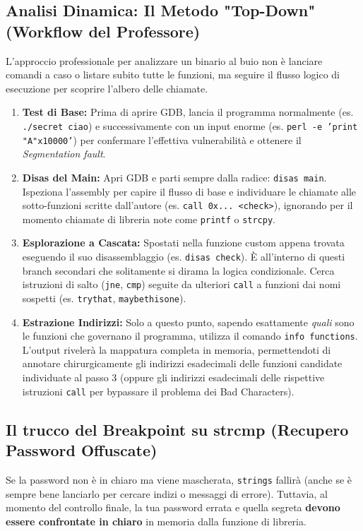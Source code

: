 \documentclass[12pt,a4paper]{report}
\begin{document}
	\subsection{Analisi Dinamica: Il Metodo "Top-Down" (Workflow del Professore)}
	L'approccio professionale per analizzare un binario al buio non è lanciare comandi a caso o listare subito tutte le funzioni, ma seguire il flusso logico di esecuzione per scoprire l'albero delle chiamate.
	
	\begin{enumerate}
		\item \textbf{Test di Base:} Prima di aprire GDB, lancia il programma normalmente (es. \texttt{./secret ciao}) e successivamente con un input enorme (es. \texttt{perl -e 'print "A"x10000'}) per confermare l'effettiva vulnerabilità e ottenere il \textit{Segmentation fault}.
		\item \textbf{Disas del Main:} Apri GDB e parti sempre dalla radice: \texttt{disas main}. Ispeziona l'assembly per capire il flusso di base e individuare le chiamate alle sotto-funzioni scritte dall'autore (es. \texttt{call 0x... <check>}), ignorando per il momento chiamate di libreria note come \texttt{printf} o \texttt{strcpy}.
		\item \textbf{Esplorazione a Cascata:} Spostati nella funzione custom appena trovata eseguendo il suo disassemblaggio (es. \texttt{disas check}). È all'interno di questi branch secondari che solitamente si dirama la logica condizionale. Cerca istruzioni di salto (\texttt{jne}, \texttt{cmp}) seguite da ulteriori \texttt{call} a funzioni dai nomi sospetti (es. \texttt{trythat}, \texttt{maybethisone}).
		\item \textbf{Estrazione Indirizzi:} Solo a questo punto, sapendo esattamente \textit{quali} sono le funzioni che governano il programma, utilizza il comando \texttt{info functions}. L'output rivelerà la mappatura completa in memoria, permettendoti di annotare chirurgicamente gli indirizzi esadecimali delle funzioni candidate individuate al passo 3 (oppure gli indirizzi esadecimali delle rispettive istruzioni \texttt{call} per bypassare il problema dei Bad Characters).
	\end{enumerate}
	
	\subsection{Il trucco del Breakpoint su strcmp (Recupero Password Offuscate)}
	Se la password non è in chiaro ma viene mascherata, \texttt{strings} fallirà (anche se è sempre bene lanciarlo per cercare indizi o messaggi di errore). Tuttavia, al momento del controllo finale, la tua password errata e quella segreta \textbf{devono essere confrontate in chiaro} in memoria dalla funzione di libreria.
	
\end{document}
